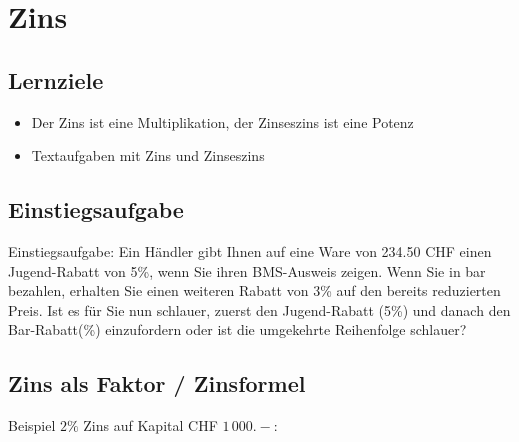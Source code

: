 
\newpage
\section{Zins}
\subsection*{Lernziele}

\begin{itemize}
  \item Der Zins ist eine  Multiplikation, der Zinseszins ist eine Potenz
\item Textaufgaben mit Zins und Zinseszins
\end{itemize}

\subsection{Einstiegsaufgabe}
Einstiegsaufgabe:
Ein Händler gibt Ihnen auf eine Ware von 234.50 CHF einen Jugend-Rabatt von
5\%, wenn Sie ihren BMS-Ausweis zeigen. Wenn Sie in bar bezahlen, erhalten Sie
einen weiteren Rabatt von 3\% auf den bereits reduzierten Preis.
Ist es für Sie nun schlauer, zuerst den
Jugend-Rabatt (5\%) und danach den Bar-Rabatt(\%) einzufordern oder
ist die umgekehrte Reihenfolge schlauer?



\newpage



\subsection{Zins als Faktor / Zinsformel}
Beispiel $2\%$ Zins auf Kapital CHF $1\,000.-$:\\

